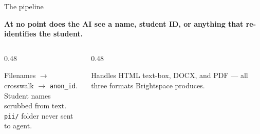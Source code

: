 \documentclass[aspectratio=169, 10pt]{beamer}
\begin{document}
\begin{frame}{The pipeline}
\begin{center}
\end{center}
\vskip3pt
\begin{tcolorbox}[accentbox, top=2pt, bottom=2pt]
\centering\small \textbf{At no point does the AI see a name, student ID, or anything that re-identifies the student.}
\end{tcolorbox}
\vskip2pt
\begin{columns}[T]
\begin{column}{0.48\textwidth}
\begin{tcolorbox}[pipelinebox, title={\faLock\quad PII stays locked}]
\scriptsize
Filenames $\rightarrow$ crosswalk $\rightarrow$ \texttt{anon\_id}. \\
Student names scrubbed from text. \\
\texttt{pii/} folder never sent to agent.
\end{tcolorbox}
\end{column}
\begin{column}{0.48\textwidth}
\begin{tcolorbox}[pipelinebox, title={\faFileCode\quad Any submission format}]
\scriptsize
Handles HTML text-box, DOCX, and PDF --- all three formats Brightspace produces.
\end{tcolorbox}
\end{column}
\end{columns}
\end{frame}
\end{document}
